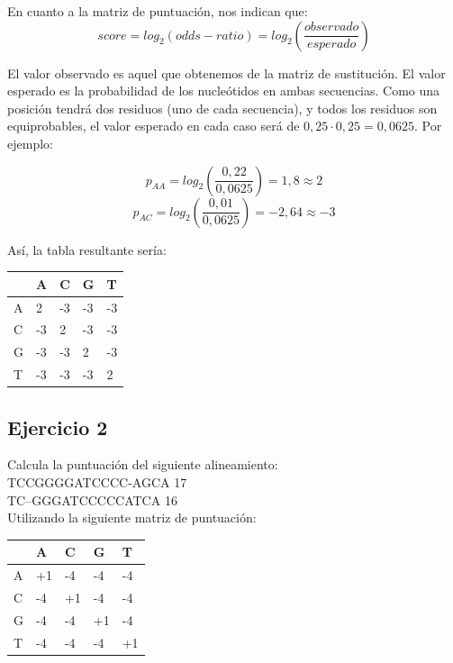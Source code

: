 En cuanto a la matriz de puntuación, nos indican que:
$$score = log_2(odds-ratio) = log_2(\frac{observado}{esperado})$$

El valor observado es aquel que obtenemos de la matriz de sustitución. El valor esperado es la probabilidad de los nucleótidos en ambas secuencias. Como una posición tendrá dos residuos (uno de cada secuencia), y todos los residuos son equiprobables, el valor esperado en cada caso será de $0,25 \cdot 0,25 = 0,0625$. Por ejemplo:

$$p_{AA} = log_2(\frac{0,22}{0,0625}) = 1,8 \approx 2$$
$$p_{AC} = log_2(\frac{0,01}{0,0625}) = -2,64 \approx -3$$

Así, la tabla resultante sería:

\begin{table}[htbp]
    \centering
    \begin{tabularx}{\textwidth}{ X | X X X X}
          & A & C & G & T \\ \hline
         A & 2 & -3 & -3 & -3 \\
         C & -3 & 2& -3 & -3 \\
         G & -3 & -3 & 2 & -3 \\
         T & -3 & -3 & -3 & 2 \\
    \end{tabularx}
\end{table}

\subsection{Ejercicio 2}
Calcula la puntuación del siguiente alineamiento: \\
TCCGGGGATCCCC-AGCA 17\\
TC--GGGATCCCCCATCA 16\\ 
Utilizando la siguiente matriz de puntuación:

\begin{table}[htbp]
    \centering
    \begin{tabularx}{\textwidth}{ X X X X X}
          & A & C & G & T \\ \hline
         A & +1 & -4 & -4 & -4 \\
         C & -4 & +1 & -4 & -4 \\
         G & -4 & -4 & +1 & -4 \\
         T & -4 & -4 & -4 & +1 \\
    \end{tabularx}
\end{table}

